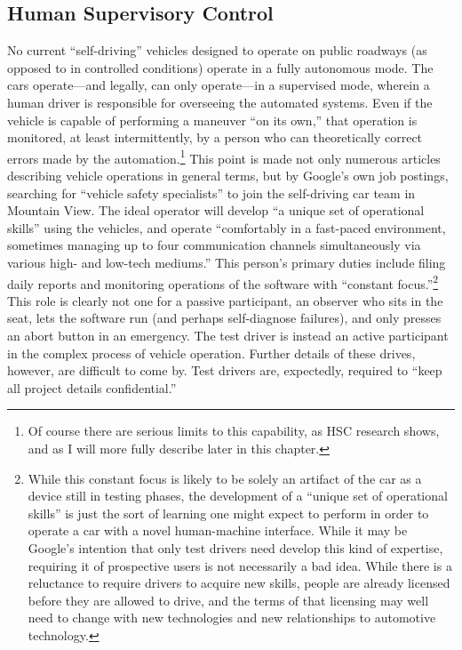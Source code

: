 \subsection{Human Supervisory Control}

No current ``self-driving'' vehicles designed to operate on public
roadways (as opposed to in controlled conditions) operate in a fully
autonomous mode. The cars operate---and legally, can only
operate\cite{???}---in
a supervised mode, wherein a human driver is responsible for
overseeing the automated systems. Even if the vehicle is capable of
performing a maneuver ``on its own,'' that operation is monitored, at
least intermittently, by a person who can theoretically correct errors
made by the automation.\footnote{Of course there are serious
  limits to this capability, as HSC research shows, and as I will
  more fully describe later in this chapter.} This point is made not
only numerous articles describing vehicle operations in general terms,
but by Google's
own job postings, searching for ``vehicle safety specialists'' to join
the self-driving car team in Mountain View. The ideal operator will
develop ``a unique set of operational skills'' using the vehicles, and
operate ``comfortably in a fast-paced environment, sometimes managing
up to four communication channels simultaneously via various high- and
low-tech mediums.''\cite{???-googleJobPosting} This person's primary
duties include filing daily reports and monitoring operations of the
software with ``constant focus.''\footnote{While this constant focus
  is likely to be solely an artifact of the car as a device still in
  testing phases, the development of a ``unique set of operational
  skills'' is just the sort of learning one might expect to perform in
order to operate a car with a novel human-machine interface. While it
may be Google's intention that only test drivers need develop this
kind of expertise, requiring it of prospective users is not
necessarily a bad idea. While there is a reluctance to require drivers
to acquire new skills, people are already licensed before they are
allowed to drive, and the terms of that licensing may well need to
change with new technologies and new relationships to automotive
technology.} This role is clearly not one for a passive participant,
an observer who sits in the seat, lets the software run (and perhaps
self-diagnose failures), and only presses an abort button in an
emergency. The test driver is instead an active participant in the
complex process of 
vehicle operation. Further details of these drives, however,
are difficult to come by. Test drivers are, expectedly, required to
``keep all project details confidential.''\cite{???-googleJobPosting}

